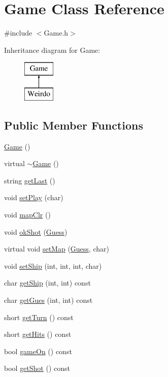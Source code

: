 \hypertarget{class_game}{}\section{Game Class Reference}
\label{class_game}


{\ttfamily \#include $<$Game.\+h$>$}

Inheritance diagram for Game\+:\begin{figure}[H]
\begin{center}
\leavevmode
\includegraphics[height=2.000000cm]{class_game}
\end{center}
\end{figure}
\subsection*{Public Member Functions}
\begin{DoxyCompactItemize}
\item 
\hyperlink{class_game_ad59df6562a58a614fda24622d3715b65}{Game} ()
\item 
virtual \hyperlink{class_game_ae3d112ca6e0e55150d2fdbc704474530}{$\sim$\+Game} ()
\item 
string \hyperlink{class_game_ab9f516c5cca41cf4807dc71108af4257}{get\+Last} ()
\item 
void \hyperlink{class_game_a9acc18b29b10e44174bb4c0c59886469}{set\+Play} (char)
\item 
void \hyperlink{class_game_a35e06b7cc99e0577418a5187b4b561ca}{map\+Clr} ()
\item 
void \hyperlink{class_game_ab9025f2355418561b9e406dd4b5da02a}{ok\+Shot} (\hyperlink{class_guess}{Guess})
\item 
virtual void \hyperlink{class_game_a4e23ede628f25d35813322e4e3f46b01}{set\+Map} (\hyperlink{class_guess}{Guess}, char)
\item 
void \hyperlink{class_game_aa4612d0ad265babef74c3a1122d0a395}{set\+Ship} (int, int, int, char)
\item 
char \hyperlink{class_game_aea2b0b27d7caacd0c5a822fc24cd9794}{get\+Ship} (int, int) const
\item 
char \hyperlink{class_game_a20ad0b0ce0078dc48b500ea04807d8ab}{get\+Gues} (int, int) const
\item 
short \hyperlink{class_game_af2c2fb7e28f94dda39b88ce4f7f4eec2}{get\+Turn} () const
\item 
short \hyperlink{class_game_a8a0b7bfc0cea9cc38dae79516cb325aa}{get\+Hits} () const
\item 
bool \hyperlink{class_game_a7ebb6acddd59f76be6b0888ca52295e6}{game\+On} () const
\item 
bool \hyperlink{class_game_a17a8524e3b04582d61a17133d8685ec6}{get\+Shot} () const
\end{DoxyCompactItemize}
